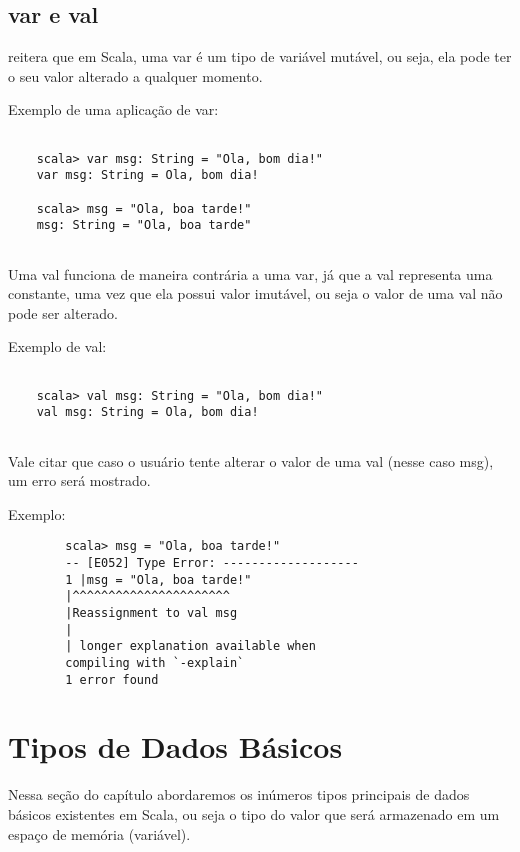 	\subsection{var e val}
	\cite{Sfregola2021} reitera que em Scala, uma var \'{e} um tipo de vari\'{a}vel mutável, ou seja, ela pode ter o seu valor alterado a qualquer momento.
	
	Exemplo de uma aplica\c{c}\~{a}o de var:
    
    \begin{lstlisting}
	   
	scala> var msg: String = "Ola, bom dia!"
	var msg: String = Ola, bom dia!
	
	scala> msg = "Ola, boa tarde!"
	msg: String = "Ola, boa tarde"
	
	\end{lstlisting}

	Uma val funciona de maneira contr\'{a}ria a uma var, já que a val representa uma constante, uma vez que ela possui valor imut\'{a}vel, ou seja o valor de uma val não pode ser alterado.
	
	Exemplo de val:
	
	\begin{lstlisting}
	
	scala> val msg: String = "Ola, bom dia!"
	val msg: String = Ola, bom dia!
		
	\end{lstlisting}

	Vale citar que caso o usu\'{a}rio tente alterar o valor de uma val (nesse caso msg), um erro ser\'{a} mostrado.
	
	Exemplo:
	
	\begin{lstlisting}
		scala> msg = "Ola, boa tarde!"
		-- [E052] Type Error: -------------------
		1 |msg = "Ola, boa tarde!"
		|^^^^^^^^^^^^^^^^^^^^^^
		|Reassignment to val msg
		|
		| longer explanation available when 
		compiling with `-explain`
		1 error found
	\end{lstlisting}
	 

    \section{Tipos de Dados B\'{a}sicos}
    
    Nessa seção do cap\'{i}tulo abordaremos os in\'{u}meros tipos principais de dados b\'{a}sicos existentes em Scala, ou seja o tipo do valor que ser\'{a} armazenado em um espaço de mem\'{o}ria (vari\'{a}vel).
    
